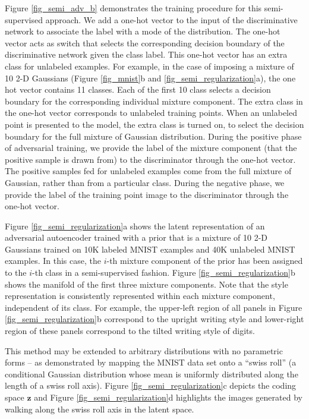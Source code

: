 \documentclass{article}
\begin{document}
Figure \ref{fig_semi_adv_b} demonstrates the training procedure for this semi-supervised approach.
We add a one-hot vector to the input of the discriminative network to associate the label with a mode of the distribution. The one-hot vector acts as switch that selects the corresponding decision boundary of the discriminative network given the class label. This one-hot vector has an extra class for unlabeled examples.
For example, in the case of imposing a mixture of 10 2-D Gaussians (Figure \ref{fig_mnist}b and \ref{fig_semi_regularization}a), the one hot vector contains 11 classes. Each of the first 10 class selects a decision boundary for the corresponding individual mixture component. The extra class in the one-hot vector corresponds to unlabeled training points. When an unlabeled point is presented to the model, the extra class is turned on, to select the decision boundary for the full mixture of Gaussian distribution.
During the positive phase of adversarial training, we provide the label of the mixture component (that the positive sample is drawn from) to the discriminator through the one-hot vector.  The positive samples fed for unlabeled examples come from the full mixture of Gaussian, rather than from a particular class.
During the negative phase, we provide the label of the training point image to the discriminator through the one-hot vector.




Figure \ref{fig_semi_regularization}a shows the latent representation of an adversarial autoencoder trained with a prior that is a mixture of 10 2-D Gaussians trained on 10K labeled MNIST examples and 40K unlabeled MNIST examples.
In this case, the $i$-th mixture component of the prior has been assigned to the $i$-th class in a semi-supervised fashion.
Figure \ref{fig_semi_regularization}b shows the manifold of the first three mixture components.
Note that the style representation is consistently represented within each mixture component, independent of its class.
For example, the upper-left region of all panels in Figure \ref{fig_semi_regularization}b correspond to the upright writing style and lower-right region of these panels correspond to the tilted writing style of digits.

This method may be extended to arbitrary distributions with no parametric forms -- as demonstrated by mapping the MNIST data set onto a ``swiss roll'' (a conditional Gaussian distribution whose mean is uniformly distributed along the length of a swiss roll axis).
Figure \ref{fig_semi_regularization}c depicts the coding space $\mathbf{z}$ and Figure \ref{fig_semi_regularization}d highlights the images generated by walking along the swiss roll axis in the latent space.
\end{document}
